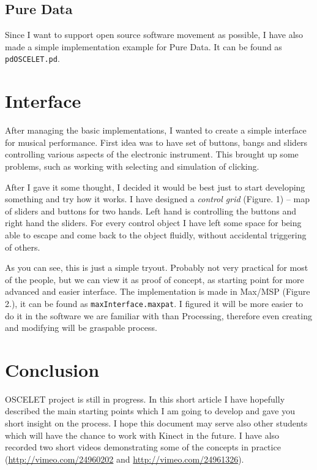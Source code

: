 \documentclass[11pt,a4paper,oneside]{article}
\begin{document}
\subsection{Pure Data}
Since I want to support open source software movement as possible, I have also made a simple implementation example for Pure Data. It can be found as \texttt{pdOSCELET.pd}.

\section{Interface}
After managing the basic implementations, I wanted to create a simple interface for musical performance. First idea was to have set of buttons, bangs and sliders controlling various aspects of the electronic instrument. This brought up some problems, such as working with selecting and simulation of clicking.

After I gave it some thought, I decided it would be best just to start developing something and try how it works. I have designed a \textit{control grid} (Figure. 1) -- map of sliders and buttons for two hands. Left hand is controlling the buttons and right hand the sliders. For every control object I have left some space for being able to escape and come back to the object fluidly, without accidental triggering of others.

As you can see, this is just a simple tryout. Probably not very practical for most of the people, but we can view it as proof of concept, as starting point for more advanced and easier interface. The implementation is made in Max/MSP (Figure 2.), it can be found as \texttt{maxInterface.maxpat}. I figured it will be more easier to do it in the software we are familiar with than Processing, therefore even creating and modifying will be graspable process.
\newpage
\section{Conclusion}
OSCELET project is still in progress. In this short article I have hopefully described the main starting points which I am going to develop and gave you short insight on the process. I hope this document may serve also other students which will have the chance to work with Kinect in the future.
I have also recorded two short videos demonstrating some of the concepts in practice (\url{http://vimeo.com/24960202} and \url{http://vimeo.com/24961326}).
\end{document}
